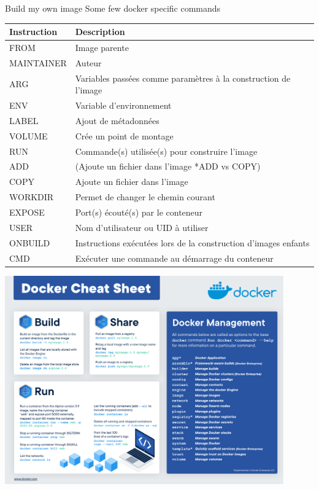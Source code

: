 \begin{frame}[fragile]{Build my own image}
Some few docker specific commands
\newline
\newline
\centering
\begin{tabular}{ll}
Instruction & Description \\
\hline\hline
FROM & Image parente \\
MAINTAINER & Auteur \\
ARG & Variables passées comme paramètres à la construction de l'image \\
ENV & Variable d'environnement \\
LABEL & Ajout de métadonnées \\
VOLUME & Crée un point de montage \\
RUN & Commande(s) utilisée(s) pour construire l'image \\
ADD & (Ajoute un fichier dans l'image *ADD vs COPY) \\
COPY & Ajoute un fichier dans l'image \\
WORKDIR & Permet de changer le chemin courant \\
EXPOSE & Port(s) écouté(s) par le conteneur \\
USER & Nom d'utilisateur ou UID à utiliser \\
ONBUILD & Instructions exécutées lors de la construction d'images enfants \\
CMD & Exécuter une commande au démarrage du conteneur \\
\end{tabular}
\end{frame}

\begin{frame}
\centering\includegraphics[width=0.9\textwidth]{images/docker-cheat-sheet.pdf}
\end{frame}

